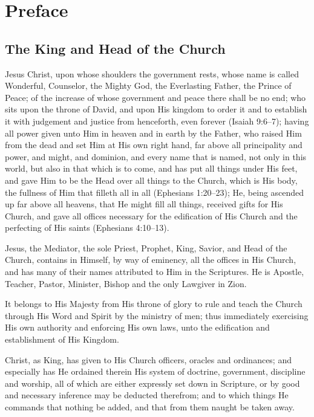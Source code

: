 \documentclass[
]{book}
\begin{document}
\hypertarget{preface}{%
\chapter{Preface}\label{preface}}

\hypertarget{the-king-and-head-of-the-church}{%
\section{The King and Head of the Church}\label{the-king-and-head-of-the-church}}

Jesus Christ, upon whose shoulders the government rests, whose name is called Wonderful, Counselor, the Mighty God, the Everlasting Father, the Prince of Peace; of the increase of whose government and peace there shall be no end; who sits upon the throne of David, and upon His kingdom to order it and to establish it with judgement and justice from henceforth, even forever (Isaiah 9:6--7); having all power given unto Him in heaven and in earth by the Father, who raised Him from the dead and set Him at His own right hand, far above all principality and power, and might, and dominion, and every name that is named, not only in this world, but also in that which is to come, and has put all things under His feet, and gave Him to be the Head over all things to the Church, which is His body, the fullness of Him that filleth all in all (Ephesians 1:20--23); He, being ascended up far above all heavens, that He might fill all things, received gifts for His Church, and gave all offices necessary for the edification of His Church and the perfecting of His saints (Ephesians 4:10--13).

Jesus, the Mediator, the sole Priest, Prophet, King, Savior, and Head of the Church, contains in Himself, by way of eminency, all the offices in His Church, and has many of their names attributed to Him in the Scriptures. He is Apostle, Teacher, Pastor, Minister, Bishop and the only Lawgiver in Zion.

It belongs to His Majesty from His throne of glory to rule and teach the Church through His Word and Spirit by the ministry of men; thus immediately exercising His own authority and enforcing His own laws, unto the edification and establishment of His Kingdom.

Christ, as King, has given to His Church officers, oracles and ordinances; and especially has He ordained therein His system of doctrine, government, discipline and worship, all of which are either expressly set down in Scripture, or by good and necessary inference may be deducted therefrom; and to which things He commands that nothing be added, and that from them naught be taken away.
\end{document}

